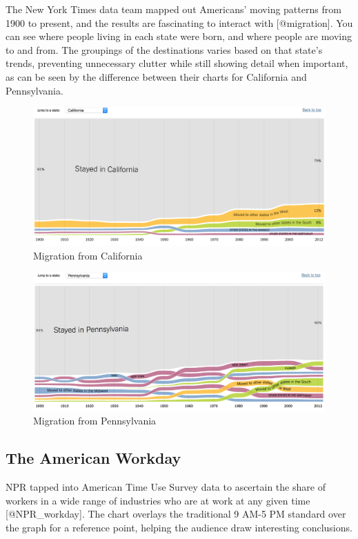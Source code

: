 \documentclass[]{book}
\theoremstyle{definition}
\theoremstyle{definition}
\theoremstyle{definition}
\theoremstyle{remark}
\begin{document}
The New York Times data team mapped out Americans' moving patterns from
1900 to present, and the results are fascinating to interact with
{[}@migration{]}. You can see where people living in each state were
born, and where people are moving to and from. The groupings of the
destinations varies based on that state's trends, preventing unnecessary
clutter while still showing detail when important, as can be seen by the
difference between their charts for California and Pennsylvania.

\begin{figure}
\centering
\includegraphics{images/CA_migration.png}
\caption{Migration from California}
\end{figure}

\begin{figure}
\centering
\includegraphics{images/PA_migration.png}
\caption{Migration from Pennsylvania}
\end{figure}

\subsection{The American Workday}\label{the-american-workday}

NPR tapped into American Time Use Survey data to ascertain the share of
workers in a wide range of industries who are at work at any given time
{[}@NPR\_workday{]}. The chart overlays the traditional 9 AM-5 PM
standard over the graph for a reference point, helping the audience draw
interesting conclusions.
\end{document}
